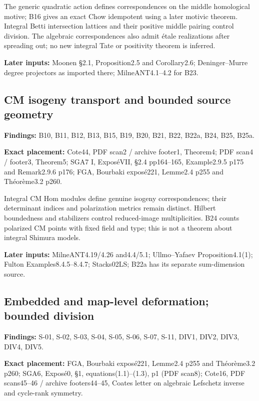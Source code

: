 \documentclass[11pt,a4paper]{article}
\theoremstyle{definition}
\begin{document}
The generic quadratic action defines correspondences on the middle
homological motive; B16 gives an exact Chow idempotent using a later
motivic theorem. Integral Betti intersection lattices and their positive
middle pairing control division. The algebraic correspondences also
admit étale realizations after spreading out; no new integral Tate or
positivity theorem is inferred.

\textbf{Later inputs:} Moonen §2.1, Proposition2.5 and Corollary2.6;
Deninger--Murre degree projectors as imported there; MilneANT4.1--4.2
for B23.

\subsection{CM isogeny transport and bounded source
geometry}\label{FRAMEWORK-cm-isogeny-transport-and-bounded-source-geometry}

\textbf{Findings:} B10, B11, B12, B13, B15, B19, B20, B21, B22, B22a,
B24, B25, B25a.

\textbf{Exact placement:} Cote44, PDF scan2 / archive footer1, Theorem4;
PDF scan4 / footer3, Theorem5; SGA7 I, ExposéVII, §2.4 pp164--165,
Example2.9.5 p175 and Remark2.9.6 p176; FGA, Bourbaki exposé221,
Lemme2.4 p255 and Théorème3.2 p260.

Integral CM Hom modules define genuine isogeny correspondences; their
determinant indices and polarization metrics remain distinct. Hilbert
boundedness and stabilizers control reduced-image multiplicities. B24
counts polarized CM points with fixed field and type; this is not a
theorem about integral Shimura models.

\textbf{Later inputs:} MilneANT4.19/4.26 and4.4/5.1; Ullmo--Yafaev
Proposition4.1(1); Fulton Examples8.4.5--8.4.7; Stacks02LS; B22a has its
separate sum-dimension source.

\subsection{Embedded and map-level deformation; bounded
division}\label{FRAMEWORK-embedded-and-map-level-deformation-bounded-division}

\textbf{Findings:} S-01, S-02, S-03, S-04, S-05, S-06, S-07, S-11, DIV1,
DIV2, DIV3, DIV4, DIV5.

\textbf{Exact placement:} FGA, Bourbaki exposé221, Lemme2.4 p255 and
Théorème3.2 p260; SGA6, Exposé0, §1, equations(1.1)--(1.3), p1 (PDF
scan8); Cote16, PDF scans45--46 / archive footers44--45, Coates letter
on algebraic Lefschetz inverse and cycle-rank symmetry.
\end{document}

